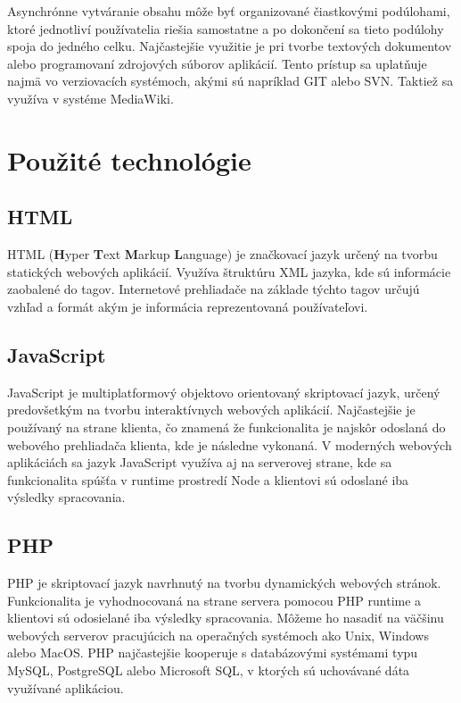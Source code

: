 Asynchrónne vytváranie obsahu môže byť organizované čiastkovými podúlohami, ktoré jednotliví používatelia riešia samostatne a po dokončení sa tieto podúlohy spoja do jedného celku. Najčastejšie využitie je pri tvorbe textových dokumentov alebo programovaní zdrojových súborov aplikácií. Tento prístup sa uplatňuje najmä vo verziovacích systémoch, akými sú napríklad GIT alebo SVN. Taktiež sa využíva v systéme MediaWiki.
\section{Použité technológie}

\subsection{HTML}
HTML (\textbf{H}yper \textbf{T}ext \textbf{M}arkup \textbf{L}anguage) je značkovací jazyk určený na tvorbu statických webových aplikácií. Využíva štruktúru XML jazyka, kde sú informácie zaobalené do tagov. Internetové prehliadače na základe týchto tagov určujú vzhľad a formát akým je informácia reprezentovaná používateľovi. 

\subsection{JavaScript}
JavaScript je multiplatformový objektovo orientovaný skriptovací jazyk, určený predovšetkým na tvorbu interaktívnych webových aplikácií. Najčastejšie je používaný na strane klienta, čo znamená že funkcionalita je najskôr odoslaná do webového prehliadača klienta, kde je následne vykonaná. V moderných webových aplikáciách sa jazyk JavaScript využíva aj na serverovej strane, kde sa funkcionalita spúšťa v runtime prostredí Node a klientovi sú odoslané iba výsledky spracovania. 

\subsection{PHP}
PHP je skriptovací jazyk navrhnutý na tvorbu dynamických webových stránok. Funkcionalita je vyhodnocovaná na strane servera pomocou PHP runtime a klientovi sú odosielané iba výsledky spracovania. Môžeme ho nasadiť na väčšinu webových serverov pracujúcich na operačných systémoch ako Unix, Windows alebo MacOS. PHP najčastejšie kooperuje s databázovými systémami typu MySQL, PostgreSQL alebo Microsoft SQL, v ktorých sú uchovávané dáta využívané aplikáciou.

